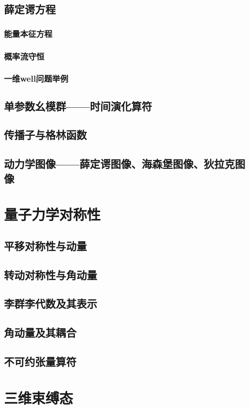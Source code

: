 \documentclass[a4paper,11pt]{book}
\begin{document}
\section{薛定谔方程}
\subsection{能量本征方程}
\subsection{概率流守恒}
\subsection{一维well问题举例}
\section{单参数幺模群——时间演化算符}
\section{传播子与格林函数}
\section{动力学图像——薛定谔图像、海森堡图像、狄拉克图像}
\chapter{量子力学对称性}
\section{平移对称性与动量}
\section{转动对称性与角动量}
\section{李群李代数及其表示}
\section{角动量及其耦合}
\section{不可约张量算符}
\chapter{三维束缚态}
\end{document}
